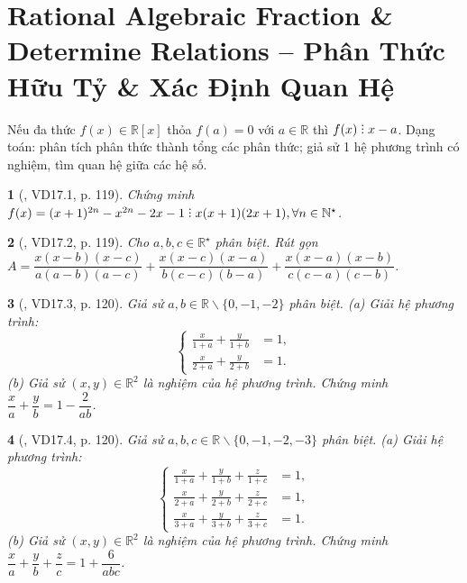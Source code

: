 \documentclass{article}
\newtheorem{baitoan}{}
\DeclareRobustCommand{\divby}{%
	\mathrel{\vbox{\baselineskip.65ex\lineskiplimit0pt\hbox{.}\hbox{.}\hbox{.}}}%
}
\begin{document}

\section{Rational Algebraic Fraction \& Determine Relations -- Phân Thức Hữu Tỷ \& Xác Định Quan Hệ}
 Nếu đa thức $f(x)\in\mathbb{R}[x]$ thỏa $f(a) = 0$ với $a\in\mathbb{R}$ thì $f(x)\divby x - a$.  Dạng toán: phân tích phân thức thành tổng các phân thức; giả sử 1 hệ phương trình có nghiệm, tìm quan hệ giữa các hệ số.

\begin{baitoan}[\cite{TLCT_THCS_Toan_9_dai_so}, VD17.1, p. 119]
	Chứng minh $f(x) = (x + 1)^{2n} - x^{2n} - 2x - 1\divby x(x + 1)(2x + 1),\forall n\in\mathbb{N}^\star$.
\end{baitoan}

\begin{baitoan}[\cite{TLCT_THCS_Toan_9_dai_so}, VD17.2, p. 119]
	Cho $a,b,c\in\mathbb{R}^\star$ phân biệt. Rút gọn $A = \dfrac{x(x - b)(x - c)}{a(a - b)(a - c)} + \dfrac{x(x - c)(x - a)}{b(c - c)(b - a)} + \dfrac{x(x - a)(x - b)}{c(c - a)(c - b)}$.
\end{baitoan}

\begin{baitoan}[\cite{TLCT_THCS_Toan_9_dai_so}, VD17.3, p. 120]
	Giả sử $a,b\in\mathbb{R}\backslash\{0,-1,-2\}$ phân biệt. (a) Giải hệ phương trình:
	\begin{equation*}
		\left\{\begin{split}
			\frac{x}{1 + a} + \frac{y}{1 + b} &= 1,\\
			\frac{x}{2 + a} + \frac{y}{2 + b} &= 1.
		\end{split}\right.
	\end{equation*}
	(b) Giả sử $(x,y)\in\mathbb{R}^2$ là nghiệm của hệ phương trình. Chứng minh $\dfrac{x}{a} + \dfrac{y}{b} = 1 - \dfrac{2}{ab}$.
\end{baitoan}

\begin{baitoan}[\cite{TLCT_THCS_Toan_9_dai_so}, VD17.4, p. 120]
	Giả sử $a,b,c\in\mathbb{R}\backslash\{0,-1,-2,-3\}$ phân biệt. (a) Giải hệ phương trình:
	\begin{equation*}
		\left\{\begin{split}
			\frac{x}{1 + a} + \frac{y}{1 + b} + \frac{z}{1 + c} &= 1,\\
			\frac{x}{2 + a} + \frac{y}{2 + b} + \frac{z}{2 + c} &= 1,\\
			\frac{x}{3 + a} + \frac{y}{3 + b} + \frac{z}{3 + c} &= 1.
		\end{split}\right.
	\end{equation*}
	(b) Giả sử $(x,y)\in\mathbb{R}^2$ là nghiệm của hệ phương trình. Chứng minh $\dfrac{x}{a} + \dfrac{y}{b} + \dfrac{z}{c} = 1 + \dfrac{6}{abc}$.
\end{baitoan}
\end{document}
